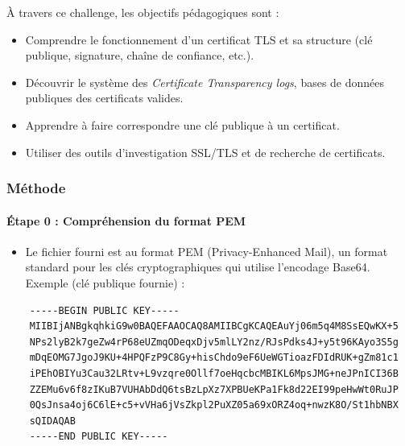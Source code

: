 \documentclass[12pt, a4paper]{article}
\begin{document}
    À travers ce challenge, les objectifs pédagogiques sont :
    \begin{itemize}
        \item Comprendre le fonctionnement d’un certificat TLS et sa
              structure (clé publique, signature, chaîne de confiance, etc.).
        \item Découvrir le système des \emph{Certificate Transparency logs},
              bases de données publiques des certificats valides.
        \item Apprendre à faire correspondre une clé publique à un certificat.
        \item Utiliser des outils d’investigation SSL/TLS et de recherche de
              certificats.
    \end{itemize}

    \subsubsection{Méthode}
    \paragraph{Étape 0 : Compréhension du format PEM}
    \begin{itemize}
        \item Le fichier fourni est au format PEM (Privacy-Enhanced Mail), un
              format standard pour les clés cryptographiques qui utilise
              l'encodage Base64. Exemple (clé publique fournie) :
    \end{itemize}

    \begin{verbatim}
    -----BEGIN PUBLIC KEY-----
    MIIBIjANBgkqhkiG9w0BAQEFAAOCAQ8AMIIBCgKCAQEAuYj06m5q4M8SsEQwKX+5
    NPs2lyB2k7geZw4rP68eUZmqODeqxDjv5mlLY2nz/RJsPdks4J+y5t96KAyo3S5g
    mDqEOMG7JgoJ9KU+4HPQFzP9C8Gy+hisChdo9eF6UeWGTioazFDIdRUK+gZm81c1
    iPEhOBIYu3Cau32LRtv+L9vzqre0Ollf7oeHqcbcMBIKL6MpsJMG+neJPnICI36B
    ZZEMu6v6f8zIKuB7VUHAbDdQ6tsBzLpXz7XPBUeKPa1Fk8d22EI99peHwWt0RuJP
    0QsJnsa4oj6C6lE+c5+vVHa6jVsZkpl2PuXZ05a69xORZ4oq+nwzK8O/St1hbNBX
    sQIDAQAB
    -----END PUBLIC KEY-----
    \end{verbatim}
\end{document}

